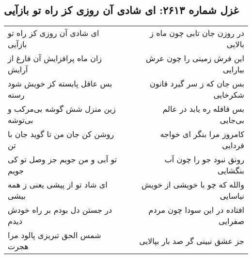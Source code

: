 \begin{center}
\section*{غزل شماره ۲۶۱۳: ای شادی آن روزی کز راه تو بازآیی}
\label{sec:2613}
\begin{longtable}{l p{0.5cm} r}
ای شادی آن روزی کز راه تو بازآیی
&&
در روزن جان تابی چون ماه ز بالایی
\\
زان ماه پرافزایش آن فارغ از آرایش
&&
این فرش زمینی را چون عرش بیارایی
\\
بس عاقل پابسته کز خویش شود رسته
&&
بس جان که ز سر گیرد قانون شکرخایی
\\
زین منزل شش گوشه بی‌مرکب و بی‌توشه
&&
بس قافله ره یابد در عالم بی‌جایی
\\
روشن کن جان من تا گوید جان با تن
&&
کامروز مرا بنگر ای خواجه فردایی
\\
تو آبی و من جویم جز وصل تو کی جویم
&&
رونق نبود جو را چون آب بنگشایی
\\
ای شاد تو از پیشی یعنی ز همه بیشی
&&
والله که چو با خویشی از خویش نیاسایی
\\
در جستن دل بودم بر راه خودش دیدم
&&
افتاده در این سودا چون مردم صفرایی
\\
شمس الحق تبریزی پالود مرا هجرت
&&
جز عشق نبینی گر صد بار بپالایی
\\
\end{longtable}
\end{center}
